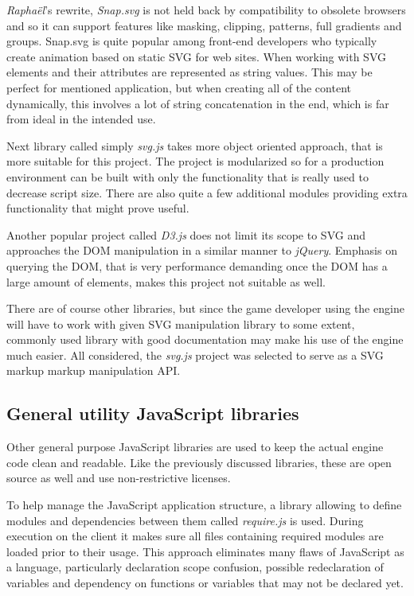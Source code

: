 \documentclass[11pt,oneside, final]{fithesis2}
\begin{document}
\emph{Raphaël}'s rewrite, \emph{Snap.svg} is not held back by compatibility to obsolete browsers and so it can support features like masking, clipping, patterns, full gradients and groups\cite{snap}. Snap.svg is quite popular among front-end developers who typically create animation based on static SVG for web sites\cite{snapusage}. When working with SVG elements and their attributes are represented as string values. This may be perfect for mentioned application, but when creating all of the content dynamically, this involves a lot of string concatenation in the end, which is far from ideal in the intended use.

Next library called simply \emph{svg.js} takes more object oriented approach\cite{svgjs}, that is more suitable for this project. The project is modularized so for a production environment can be built with only the functionality that is really used to decrease script size. There are also quite a few additional modules providing extra functionality that might prove useful.

Another popular project called \emph{D3.js} does not limit its scope to SVG and approaches the DOM manipulation in a similar manner to \emph{jQuery}\cite{d3js}. Emphasis on querying the DOM, that is very performance demanding once the DOM has a large amount of elements, makes this project not suitable as well.

There are of course other libraries, but since the game developer using the engine will have to work with given SVG manipulation library to some extent, commonly used library with good documentation may make his use of the engine much easier. All considered, the \emph{svg.js} project was selected to serve as a SVG markup markup manipulation API.

\subsection{General utility JavaScript libraries}
\label{jslibs}
Other general purpose JavaScript libraries are used to keep the actual engine code clean and readable. Like the previously discussed libraries, these are open source as well and use non-restrictive licenses.

To help manage the JavaScript application structure, a library allowing to define modules and dependencies between them called \emph{require.js} is used. During execution on the client it makes sure all files containing required modules are loaded prior to their usage. \cite{requirejs} This approach eliminates many flaws of JavaScript as a language, particularly declaration scope confusion, possible redeclaration of variables and dependency on functions or variables that may not be declared yet.
\end{document}
